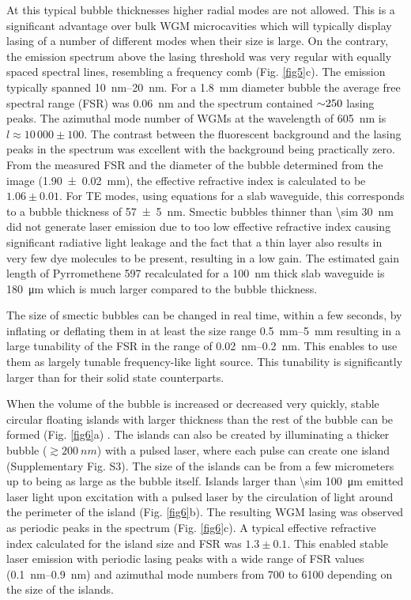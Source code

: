 \documentclass[a4paper,12pt]{article}
\begin{document}
	At this typical bubble thicknesses higher radial modes are not allowed. This is a significant advantage over bulk WGM microcavities which will typically display lasing of a number of different modes when their size is large. On the contrary, the emission spectrum above the lasing threshold was very regular with equally spaced spectral lines, resembling a frequency comb (Fig. \ref{fig5}c). The emission typically spanned \SIrange{10}{20}{nm}. For a \SI{1.8}{mm} diameter bubble the average free spectral range (FSR) was \SI{0.06}{nm} and the spectrum contained $\SI{\sim 250}{}$ lasing peaks. The azimuthal mode number of WGMs at the wavelength of \SI{605}{nm} is $l\approx 10\,000\pm100$. The contrast between the fluorescent background and the lasing peaks in the spectrum was excellent with the background being practically zero. From the measured FSR and the diameter of the bubble determined from the image (\SI{1.90 \pm 0.02}{mm}), the effective refractive index is calculated to be $1.06 \pm 0.01$. For TE modes, using equations for a slab waveguide, this corresponds to a bubble thickness of \SI{57 \pm 5}{nm}. Smectic bubbles thinner than \SI{\sim 30}{nm} did not generate laser emission due to too low effective refractive index causing significant radiative light leakage and the fact that a thin layer also results in very few dye molecules to be present, resulting in a low gain. The estimated gain length of Pyrromethene 597 recalculated for a \SI{100}{nm} thick slab waveguide is \SI{180}{\micro m} \cite{vellaichamy2023optical,lyu2021correction} which is much larger compared to the bubble thickness.
	 
	 
	The size of smectic bubbles can be changed in real time, within a few seconds, by inflating or deflating them in at least the size range \SIrange{0.5}{5}{mm} resulting in a large tunability of the FSR in the range of \SIrange{0.02}{0.2}{nm}. This enables to use them as largely tunable frequency-like light source. This tunability is significantly larger than for their solid state counterparts.
	
	
	When the volume of the bubble is increased or decreased very quickly, stable circular floating islands with larger thickness than the rest of the bubble can be formed (Fig. \ref{fig6}a) \cite{clark2017realization,stannarius1998self}. The islands can also be created by illuminating a thicker bubble ($\gtrsim\SI{200}{nm}$) with a pulsed laser, where each pulse can create one island (Supplementary Fig. S3). The size of the islands can be from a few micrometers up to being as large as the bubble itself. Islands larger than \SI{\sim 100}{\micro m} emitted laser light upon excitation with a pulsed laser by the circulation of light around the perimeter of the island (Fig. \ref{fig6}b). The resulting WGM lasing was observed as periodic peaks in the spectrum (Fig. \ref{fig6}c). A typical effective refractive index calculated for the island size and FSR was $1.3 \pm 0.1$. This enabled stable laser emission with periodic lasing peaks with a wide range of FSR values (\SIrange{0.1}{0.9}{nm}) and azimuthal mode numbers from 700 to 6100 depending on the size of the islands.
	
\end{document}
